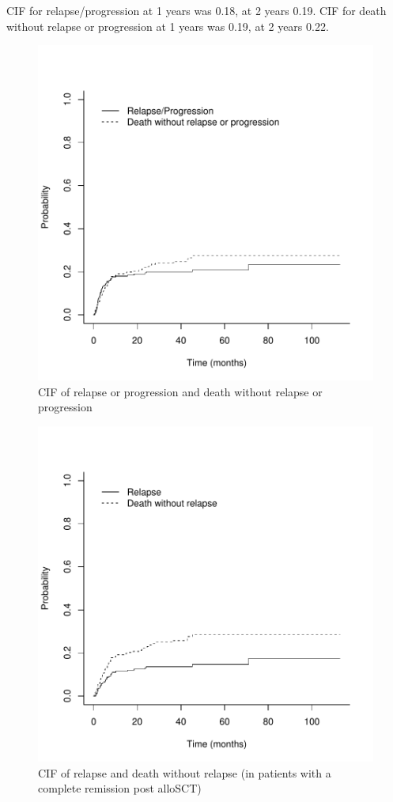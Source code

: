 \documentclass[a4paper,11pt] {article}
\begin{document}
CIF for relapse/progression at 1 years was 0.18, at 2 years  0.19.
CIF for death without relapse or progression at 1 years was 0.19, at 2 years  0.22. 

\begin{figure}
\begin{center}
\includegraphics{Rapport-fig6}
\end{center}
\caption{CIF of relapse or progression and death without relapse or progression}
\label{fig6}
\end{figure}


\begin{figure}
\begin{center}
\includegraphics{Rapport-fig7}
\end{center}
\caption{CIF of relapse and death without relapse (in patients with a complete remission post alloSCT)}
\label{fig7}
\end{figure}
\end{document}
